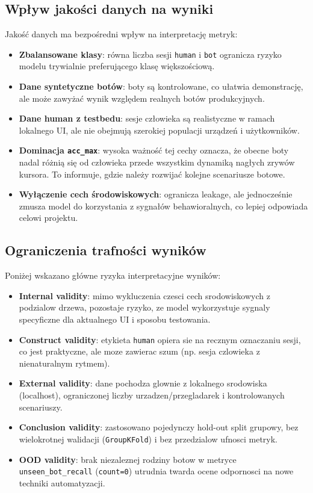 \subsection{Wpływ jakości danych na wyniki}
Jakość danych ma bezpośredni wpływ na interpretację metryk:
\begin{itemize}
  \item \textbf{Zbalansowane klasy}: równa liczba sesji \texttt{human} i
  \texttt{bot} ogranicza ryzyko modelu trywialnie preferującego klasę większościową.
  \item \textbf{Dane syntetyczne botów}: boty są kontrolowane, co ułatwia
  demonstrację, ale może zawyżać wynik względem realnych botów produkcyjnych.
  \item \textbf{Dane human z testbedu}: sesje człowieka są realistyczne w ramach
  lokalnego UI, ale nie obejmują szerokiej populacji urządzeń i użytkowników.
  \item \textbf{Dominacja \texttt{acc\_max}}: wysoka ważność tej cechy oznacza,
  że obecne boty nadal różnią się od człowieka przede wszystkim dynamiką nagłych
  zrywów kursora. To informuje, gdzie należy rozwijać kolejne scenariusze botowe.
  \item \textbf{Wyłączenie cech środowiskowych}: ogranicza leakage, ale jednocześnie
  zmusza model do korzystania z sygnałów behawioralnych, co lepiej odpowiada celowi projektu.
\end{itemize}

\subsection{Ograniczenia trafności wyników}
Poniżej wskazano główne ryzyka interpretacyjne wyników:
\begin{itemize}
  \item \textbf{Internal validity}: mimo wykluczenia czesci cech srodowiskowych z podzialow drzewa,
  pozostaje ryzyko, ze model wykorzystuje sygnaly specyficzne dla aktualnego UI i sposobu testowania.
  \item \textbf{Construct validity}: etykieta \texttt{human} opiera sie na recznym oznaczaniu sesji,
  co jest praktyczne, ale moze zawierac szum (np. sesja czlowieka z nienaturalnym rytmem).
  \item \textbf{External validity}: dane pochodza glownie z lokalnego srodowiska (localhost),
  ograniczonej liczby urzadzen/przegladarek i kontrolowanych scenariuszy.
  \item \textbf{Conclusion validity}: zastosowano pojedynczy hold-out split grupowy,
  bez wielokrotnej walidacji (\texttt{GroupKFold}) i bez przedzialow ufnosci metryk.
  \item \textbf{OOD validity}: brak niezaleznej rodziny botow w metryce \texttt{unseen\_bot\_recall}
  (\texttt{count=0}) utrudnia twarda ocene odpornosci na nowe techniki automatyzacji.
\end{itemize}

